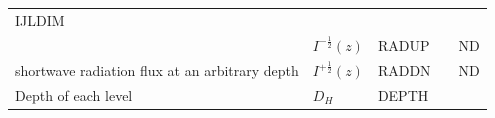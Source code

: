 \begin{longtable}[]{@{}lllll@{}}
\begin{minipage}[t]{0.10\columnwidth}
IJLDIM\strut
\end{minipage} & \begin{minipage}[t]{0.10\columnwidth}\raggedright
\strut
\end{minipage}\tabularnewline
\begin{minipage}[t]{0.44\columnwidth}\raggedright
\strut
\end{minipage} & \begin{minipage}[t]{0.15\columnwidth}\raggedright
\(I^{-\frac{1}{2}}(z)\)\strut
\end{minipage} & \begin{minipage}[t]{0.07\columnwidth}\raggedright
RADUP\strut
\end{minipage} & \begin{minipage}[t]{0.10\columnwidth}\raggedright
\strut
\end{minipage} & \begin{minipage}[t]{0.10\columnwidth}\raggedright
\(\mathrm{ND}\)\strut
\end{minipage}\tabularnewline
\begin{minipage}[t]{0.44\columnwidth}\raggedright
shortwave radiation flux at an arbitrary depth\strut
\end{minipage} & \begin{minipage}[t]{0.15\columnwidth}\raggedright
\(I^{+\frac{1}{2}}(z)\)\strut
\end{minipage} & \begin{minipage}[t]{0.07\columnwidth}\raggedright
RADDN\strut
\end{minipage} & \begin{minipage}[t]{0.10\columnwidth}\raggedright
\strut
\end{minipage} & \begin{minipage}[t]{0.10\columnwidth}\raggedright
\(\mathrm{ND}\)\strut
\end{minipage}\tabularnewline
\begin{minipage}[t]{0.44\columnwidth}\raggedright
Depth of each level\strut
\end{minipage} & \begin{minipage}[t]{0.15\columnwidth}\raggedright
\(D_H\)\strut
\end{minipage} & \begin{minipage}[t]{0.07\columnwidth}\raggedright
DEPTH\strut
\end{minipage} & \begin{minipage}[t]{0.10\columnwidth}\raggedright
\strut
\end{minipage} & \begin{minipage}[t]{0.10\columnwidth}\raggedright

\end{minipage}
\end{longtable}
